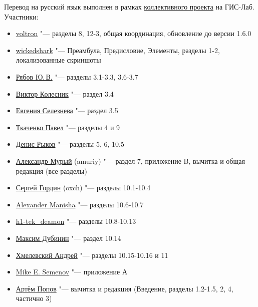Перевод на русский язык выполнен в рамках
\href{http://gis-lab.info/docs/qgis/manual15.html}{коллективного проекта}
на ГИС-Лаб. Участники:
\begin{itemize}[label=--]
\item \href{http://gis-lab.info/forum/memberlist.php?mode=viewprofile&u=5325}{voltron}
"--- разделы 8, 12-3, общая координация, обновление до версии 1.6.0
\item \href{http://gis-lab.info/forum/memberlist.php?mode=viewprofile&u=7967}{wickedshark}
"--- Преамбула, Предисловие, Элементы, разделы 1-2, локализованные скриншоты
\item \href{http://gis-lab.info/forum/memberlist.php?mode=viewprofile&u=7619}{Рябов Ю.\,В.}
"--- разделы 3.1-3.3, 3.6-3.7
\item \href{http://gis-lab.info/forum/memberlist.php?mode=viewprofile&u=9954}{Виктор Колесник}
"--- раздел 3.4
\item \href{http://gis-lab.info/forum/memberlist.php?mode=viewprofile&u=7392}{Евгения Селезнева}
"--- раздел 3.5
\item \href{http://gis-lab.info/forum/memberlist.php?mode=viewprofile&u=8193}{Ткаченко Павел}
"--- разделы 4 и 9
\item \href{http://gis-lab.info/forum/memberlist.php?mode=viewprofile&u=6901}{Денис Рыков}
"--- разделы 5, 6, 10.5
\item \href{http://gis-lab.info/forum/memberlist.php?mode=viewprofile&u=8430}{Александр Мурый} (amuriy)
"--- раздел 7, приложение B, вычитка и общая редакция (все разделы)
\item \href{http://gis-lab.info/forum/memberlist.php?mode=viewprofile&u=9129}{Сергей Гордин} (oxch)
"--- разделы 10.1-10.4
\item \href{http://gis-lab.info/forum/memberlist.php?mode=viewprofile&u=1394}{Alexander Manisha}
"--- разделы 10.6-10.7
\item \href{http://gis-lab.info/forum/memberlist.php?mode=viewprofile&u=9850}{h1-tek\_deamon}
"--- разделы 10.8-10.13
\item \href{http://gis-lab.info/forum/memberlist.php?mode=viewprofile&u=2}{Максим Дубинин}
"--- раздел 10.14
\item \href{http://gis-lab.info/forum/memberlist.php?mode=viewprofile&u=9719}{Хмелевский Андрей}
"--- разделы 10.15-10.16 и 11
\item \href{http://gis-lab.info/forum/memberlist.php?mode=viewprofile&u=9876}{Mike E. Semenov}
"--- приложение А
\item \href{http://gis-lab.info/forum/memberlist.php?mode=viewprofile&u=7246}{Артём Попов}
"--- вычитка и редакция (Введение, разделы 1.2-1.5, 2, 4, частично 3)
\end{itemize}

